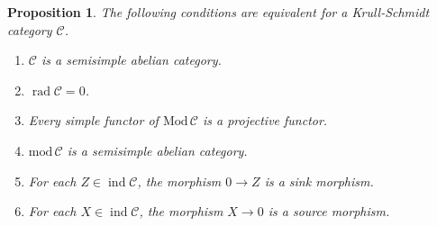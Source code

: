 \documentclass[12pt]{amsart}
\numberwithin{equation}{subsection}
\theoremstyle{plain}
\newtheorem{proposition}[theorem]{Proposition}
\theoremstyle{definition}
\newcommand{\rad}{\operatorname{rad}}
\renewcommand{\mod}{\mathrm{mod}\,}
\newcommand{\Mod}{\mathrm{Mod}\,}
\newcommand{\ind}{\operatorname{ind}}
\newcommand{\C}{\mathcal{C}}
\begin{document}
\begin{proposition}\label{claim_6}
The following conditions are equivalent for a Krull-Schmidt category $\C$.
\begin{enumerate}
\item $\C$ is a semisimple abelian category.
\item $\rad\C = 0$.
\item Every simple functor of $\Mod\C$ is a projective functor.
\item $\mod\C$ is a semisimple abelian category. 
\item For each $Z\in\ind\C$, the morphism $0\to Z$ is a sink morphism.
\item For each $X\in\ind\C$, the morphism $X\to 0$ is a source morphism.
\end{enumerate}
\end{proposition}
\end{document}

